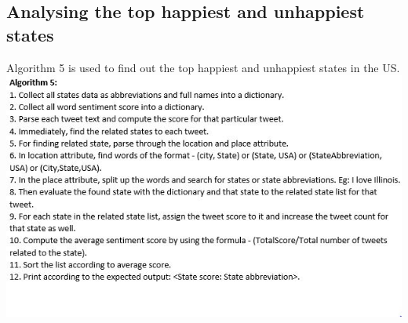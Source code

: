 \documentclass[11pt,english]{article}
\begin{document}
\subsection{Analysing the top happiest and unhappiest states}
Algorithm 5 is used to find out the top happiest and unhappiest states in the US.\\
\includegraphics{algo5.jpg}
\end{document}
